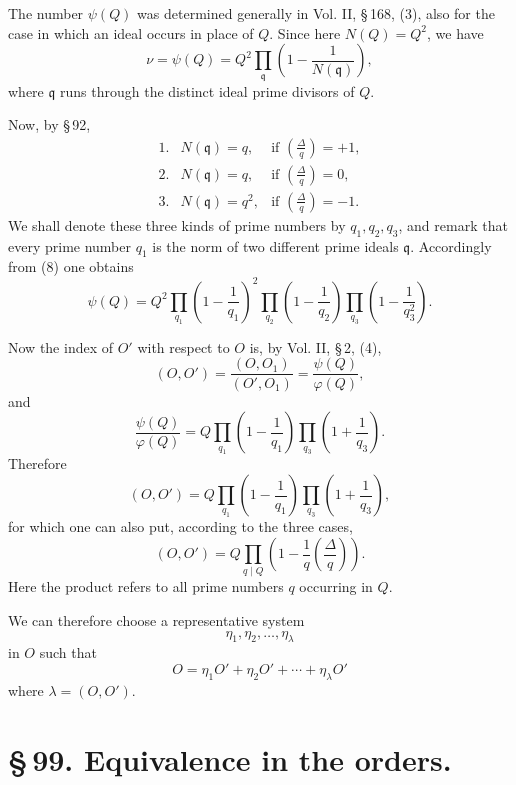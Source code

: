 \documentclass[11pt]{article}
\newcommand{\Jac}[2]{\left(\frac{#1}{#2}\right)}
\begin{document}
The number $\psi(Q)$ was determined generally in Vol. II, \S\,168, (3), also for the case in which an ideal occurs in place of $Q$. Since here $N(Q)=Q^2$, we have
\begin{equation}
 \nu=\psi(Q)=Q^2\prod_{\mathfrak q}\left(1-\frac1{N(\mathfrak q)}\right),
\tag{8}
\end{equation}
where $\mathfrak q$ runs through the distinct ideal prime divisors of $Q$.

Now, by \S\,92,
\[
\begin{array}{lll}
1.& N(\mathfrak q)=q,   & \text{if } \Jac{\Delta}{q}=+1,\\
2.& N(\mathfrak q)=q,   & \text{if } \Jac{\Delta}{q}=0,\\
3.& N(\mathfrak q)=q^2, & \text{if } \Jac{\Delta}{q}=-1.
\end{array}
\]
We shall denote these three kinds of prime numbers by $q_1,q_2,q_3$, and remark that every prime number $q_1$ is the norm of two different prime ideals $\mathfrak q$. Accordingly from (8) one obtains
\begin{equation}
 \psi(Q)
 =Q^2
  \prod_{q_1}\left(1-\frac1{q_1}\right)^2
  \prod_{q_2}\left(1-\frac1{q_2}\right)
  \prod_{q_3}\left(1-\frac1{q_3^2}\right).
\tag{9}
\end{equation}

Now the index of $O'$ with respect to $O$ is, by Vol. II, \S\,2, (4),
\[
 (O,O')=\frac{(O,O_1)}{(O',O_1)}=\frac{\psi(Q)}{\varphi(Q)},
\]
and
\[
 \frac{\psi(Q)}{\varphi(Q)}
 =Q\prod_{q_1}\left(1-\frac1{q_1}\right)
    \prod_{q_3}\left(1+\frac1{q_3}\right).
\]
Therefore
\[
 (O,O')
 =Q\prod_{q_1}\left(1-\frac1{q_1}\right)
    \prod_{q_3}\left(1+\frac1{q_3}\right),
\]
for which one can also put, according to the three cases,
\begin{equation}
 (O,O')=
 Q\prod_{q\mid Q}\left(1-\frac1q\Jac{\Delta}{q}\right).
\tag{10}
\end{equation}
Here the product refers to all prime numbers $q$ occurring in $Q$.

We can therefore choose a representative system
\[
 \eta_1,\eta_2,\ldots,\eta_\lambda
\]
in $O$ such that
\begin{equation}
 O=\eta_1O'+\eta_2O'+\cdots+\eta_\lambda O'
\tag{11}
\end{equation}
where $\lambda=(O,O')$.

\section*{\S\,99. Equivalence in the orders.}
\end{document}

